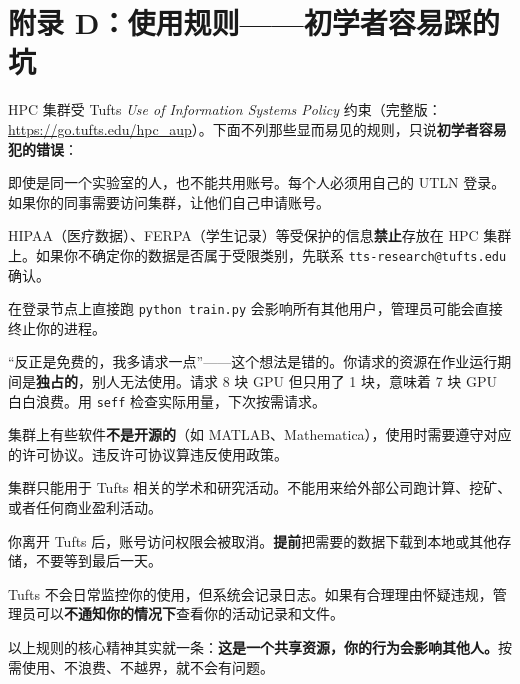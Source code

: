 \section{附录 D：使用规则——初学者容易踩的坑}
\label{sec:policy}

HPC 集群受 Tufts \textit{Use of Information Systems Policy} 约束（完整版：\url{https://go.tufts.edu/hpc_aup}）。下面不列那些显而易见的规则，只说\textbf{初学者容易犯的错误}：

\begin{description}[style=nextline,leftmargin=2em]

  \item[不要把账号密码分享给同事]
    即使是同一个实验室的人，也不能共用账号。每个人必须用自己的 UTLN 登录。如果你的同事需要访问集群，让他们自己申请账号。

  \item[不要在集群上存放受限数据]
    HIPAA（医疗数据）、FERPA（学生记录）等受保护的信息\textbf{禁止}存放在 HPC 集群上。如果你不确定你的数据是否属于受限类别，先联系 \texttt{tts-research@tufts.edu} 确认。

  \item[不要在登录节点上跑计算]
    在登录节点上直接跑 \texttt{python train.py} 会影响所有其他用户，管理员可能会直接终止你的进程。

  \item[不要请求远超实际需要的资源]
    ``反正是免费的，我多请求一点''——这个想法是错的。你请求的资源在作业运行期间是\textbf{独占的}，别人无法使用。请求 8 块 GPU 但只用了 1 块，意味着 7 块 GPU 白白浪费。用 \texttt{seff} 检查实际用量，下次按需请求。

  \item[注意软件许可证]
    集群上有些软件\textbf{不是开源的}（如 MATLAB、Mathematica），使用时需要遵守对应的许可协议。违反许可协议算违反使用政策。

  \item[不要用 HPC 做商业用途]
    集群只能用于 Tufts 相关的学术和研究活动。不能用来给外部公司跑计算、挖矿、或者任何商业盈利活动。

  \item[毕业或离职前备份你的数据]
    你离开 Tufts 后，账号访问权限会被取消。\textbf{提前}把需要的数据下载到本地或其他存储，不要等到最后一天。

  \item[你在集群上的活动不是完全私密的]
    Tufts 不会日常监控你的使用，但系统会记录日志。如果有合理理由怀疑违规，管理员可以\textbf{不通知你的情况下}查看你的活动记录和文件。

\end{description}

\begin{tipbox}
以上规则的核心精神其实就一条：\textbf{这是一个共享资源，你的行为会影响其他人。}按需使用、不浪费、不越界，就不会有问题。
\end{tipbox}
